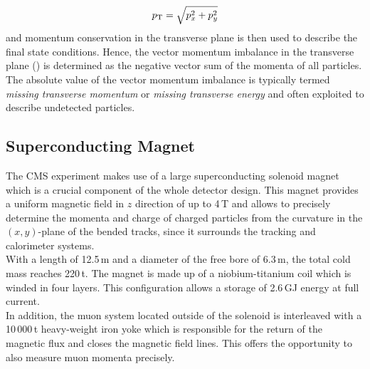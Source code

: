 \begin{equation}
p_{\text{T}} = \sqrt{p_x^2 + p_y^2} 
\end{equation}
and momentum conservation in the transverse plane is then used to describe the final state conditions. Hence, the vector momentum imbalance in the transverse plane (\metvec) is determined as the negative vector sum of the momenta of all particles. The absolute value of the vector momentum imbalance \met is typically termed \textit{missing transverse momentum} or \textit{missing transverse energy} and often exploited to describe undetected particles.

\subsection{Superconducting Magnet}
\label{subsec:cms_magnet}
The CMS experiment makes use of a large superconducting solenoid magnet which is a crucial component of the whole detector design. This magnet provides a uniform magnetic field in $z$ direction of up to 4\,T and allows to precisely determine the momenta and charge of charged particles from the curvature in the $(x, y)$-plane of the bended tracks, since it surrounds the tracking and calorimeter systems.\\
With a length of 12.5\,m and a diameter of the free bore of 6.3\,m, the total cold mass reaches 220\,t. The magnet is made up of a niobium-titanium coil which is winded in four layers. This configuration allows a storage of 2.6\,GJ energy at full current. \\
In addition, the muon system located outside of the solenoid is interleaved with a 10\,000\,t heavy-weight iron yoke which is responsible for the return of the magnetic flux and closes the magnetic field lines. This offers the opportunity to also measure muon momenta precisely.  

